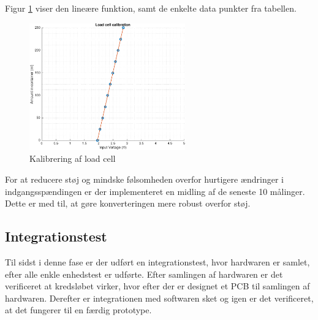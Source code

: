 Figur \ref{fig:loadcellcalib} viser den lineære funktion, samt de enkelte data punkter fra tabellen. 
\begin{figure}[H]
	\centering
	\includegraphics[width=0.6\textwidth]{billeder/software/calibration-crop.pdf}
	\caption{Kalibrering af load cell}
	\label{fig:loadcellcalib}
\end{figure}

For at reducere støj og mindske følsomheden overfor hurtigere ændringer i indgangsspændingen er der implementeret en midling af de seneste 10 målinger. Dette er med til, at gøre konverteringen mere robust overfor støj. 


\subsection{Integrationstest}
Til sidst i denne fase er der udført en integrationstest, hvor hardwaren er samlet, efter alle enkle enhedstest er udførte. Efter samlingen af hardwaren er det verificeret at kredsløbet virker, hvor efter der er designet et PCB til samlingen af hardwaren. Derefter er integrationen med softwaren sket og igen er det verificeret, at det fungerer til en færdig prototype. 

